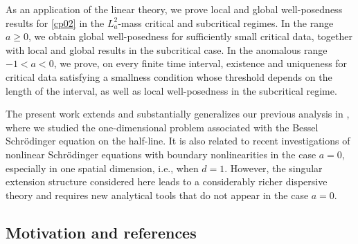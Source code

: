 \documentclass[11pt,letter]{amsart}
\numberwithin{equation}{section}
\numberwithin{equation}{section}
\begin{document}
As an application of the linear theory, we prove local and global well-posedness results for \eqref{cp02} in the $L_a^2$-mass critical and subcritical regimes. In the range $a\ge 0$, we obtain global well-posedness for sufficiently small critical data, together with local and global results in the subcritical case. In the anomalous range $-1<a<0$, we prove, on every finite time interval, existence and uniqueness for critical data satisfying a smallness condition whose threshold depends on the length of the interval, as well as local well-posedness in the subcritical regime.

The present work extends and substantially generalizes our previous analysis in \cite{GS}, where we studied the one-dimensional problem associated with the Bessel Schr\"odinger equation on the half-line. It is also related to recent investigations of nonlinear Schr\"odinger equations with boundary nonlinearities in the case $a=0$, especially in one spatial dimension, i.e., when $d=1$. However, the singular extension structure considered here leads to a considerably richer dispersive theory and requires new analytical tools that do not appear in the case $a=0$.

\medskip



\subsection{Motivation and references}\label{S:mot}


\end{document}
